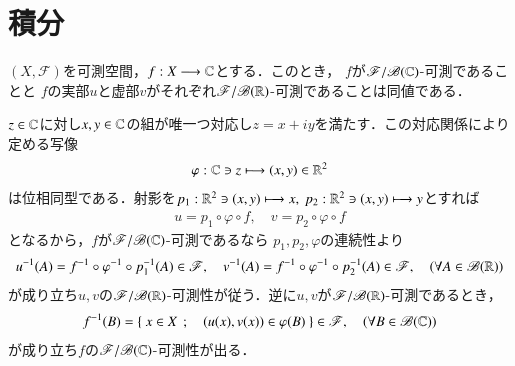 \section{積分}
	\begin{screen}
		\begin{thm}[複素数値関数の可測性]\label{thm:measurability_of_complex_measurable_functions}
			$(X,\mathscr{F})$を可測空間，$f:X \longrightarrow \mathbb{C}$とする．このとき，
			$f$が$\mathscr{F}/\mathscr{B}(\mathbb{C})$-可測であることと
			$f$の実部$u$と虚部$v$がそれぞれ$\mathscr{F}/\mathscr{B}(\mathbb{R})$-可測であることは同値である．
		\end{thm}
	\end{screen}
	
	\begin{prf}
		$z \in \mathbb{C}$に対し$x,y \in \mathbb{C}$の組が唯一つ対応し$z = x + i y$を満たす．この対応関係により定める写像
		\begin{align}
			\varphi:\mathbb{C} \ni z \longmapsto (x,y) \in \mathbb{R}^2
		\end{align}
		は位相同型である．射影を$p_1:\mathbb{R}^2 \ni (x,y) \longmapsto x,
		\ p_2:\mathbb{R}^2 \ni (x,y) \longmapsto y$とすれば
		\begin{align}
			u = p_1 \circ \varphi \circ f,
			\quad v = p_2 \circ \varphi \circ f
		\end{align}
		となるから，$f$が$\mathscr{F}/\mathscr{B}(\mathbb{C})$-可測であるなら
		$p_1,p_2,\varphi$の連続性より
		\begin{align}
			u^{-1}(A) = f^{-1} \circ \varphi^{-1} \circ p_1^{-1}(A) \in \mathscr{F},
			\quad v^{-1}(A) = f^{-1} \circ \varphi^{-1} \circ p_2^{-1}(A) \in \mathscr{F},
			\quad (\forall A \in \mathscr{B}(\mathbb{R}))
		\end{align}
		が成り立ち$u,v$の$\mathscr{F}/\mathscr{B}(\mathbb{R})$-可測性が従う．逆に$u,v$が$\mathscr{F}/\mathscr{B}(\mathbb{R})$-可測であるとき，
		\begin{align}
			f^{-1}(B) = \left\{\ x \in X\ \, ; \quad (u(x),v(x)) \in \varphi(B)\ \right\} \in \mathscr{F},
			\quad (\forall B \in \mathscr{B}(\mathbb{C}))
		\end{align}
		が成り立ち$f$の$\mathscr{F}/\mathscr{B}(\mathbb{C})$-可測性が出る．
		\QED
	\end{prf}
	
